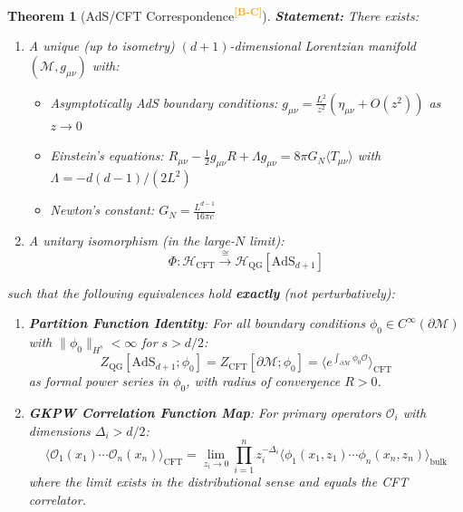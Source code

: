 \documentclass[12pt,a4paper]{article}
\newtheorem{theorem}{Theorem}[section]
\newcommand{\levelBC}{\textsuperscript{\textcolor{orange}{\textbf{[B-C]}}}}
\begin{document}
\begin{theorem}[AdS/CFT Correspondence\levelBC]
\textbf{Statement:} There exists:
\begin{enumerate}[label=(\alph*)]
    \item A unique (up to isometry) $(d+1)$-dimensional Lorentzian manifold $(\mathcal{M}, g_{\mu\nu})$ with:
    \begin{itemize}
        \item Asymptotically AdS boundary conditions: $g_{\mu\nu} = \frac{L^2}{z^2}(\eta_{\mu\nu} + O(z^2))$ as $z \to 0$
        \item Einstein's equations: $R_{\mu\nu} - \frac{1}{2}g_{\mu\nu}R + \Lambda g_{\mu\nu} = 8\pi G_N \langle T_{\mu\nu}\rangle$ with $\Lambda = -d(d-1)/(2L^2)$
        \item Newton's constant: $G_N = \frac{L^{d-1}}{16\pi c}$
    \end{itemize}
    
    \item A unitary isomorphism (in the large-$N$ limit):
    \begin{equation}
    \boxed{\Phi: \mathcal{H}_{\text{CFT}} \xrightarrow{\cong} \mathcal{H}_{\text{QG}}[\text{AdS}_{d+1}]}
    \end{equation}
\end{enumerate}

such that the following equivalences hold \textbf{exactly} (not perturbatively):
\begin{enumerate}[label=(\roman*)]
    \item \textbf{Partition Function Identity}: For all boundary conditions $\phi_0 \in C^\infty(\partial\mathcal{M})$ with $\|\phi_0\|_{H^s} < \infty$ for $s > d/2$:
    \begin{equation}
    Z_{\text{QG}}[\text{AdS}_{d+1}; \phi_0] = Z_{\text{CFT}}[\partial\mathcal{M}; \phi_0] = \langle e^{\int_{\partial\mathcal{M}} \phi_0 \mathcal{O}} \rangle_{\text{CFT}}
    \end{equation}
    as formal power series in $\phi_0$, with radius of convergence $R > 0$.
    
    \item \textbf{GKPW Correlation Function Map}: For primary operators $\mathcal{O}_i$ with dimensions $\Delta_i > d/2$:
    \begin{equation}
    \langle \mathcal{O}_1(x_1)\cdots\mathcal{O}_n(x_n)\rangle_{\text{CFT}} = \lim_{z_i\to 0} \prod_{i=1}^n z_i^{-\Delta_i}\langle\phi_1(x_1,z_1)\cdots\phi_n(x_n,z_n)\rangle_{\text{bulk}}
    \end{equation}
    where the limit exists in the distributional sense and equals the CFT correlator.
    

\end{enumerate}
\end{theorem}
\end{document}
